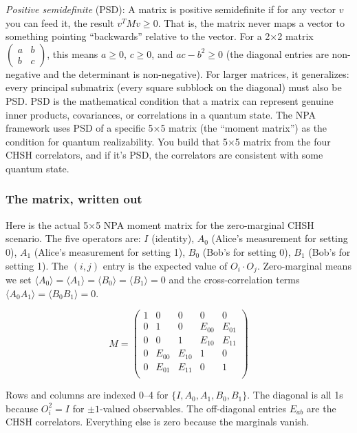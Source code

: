 \documentclass[11pt,a4paper]{article}
\theoremstyle{plain}
\theoremstyle{definition}
\theoremstyle{remark}
\begin{document}
\emph{Positive semidefinite} (PSD): A matrix is positive semidefinite if for any vector $v$ you can feed it, the result $v^T M v \geq 0$. That is, the matrix never maps a vector to something pointing ``backwards'' relative to the vector. For a 2×2 matrix $\begin{pmatrix} a & b \\ b & c \end{pmatrix}$, this means $a \geq 0$, $c \geq 0$, and $ac - b^2 \geq 0$ (the diagonal entries are non-negative and the determinant is non-negative). For larger matrices, it generalizes: every principal submatrix (every square subblock on the diagonal) must also be PSD. PSD is the mathematical condition that a matrix can represent genuine inner products, covariances, or correlations in a quantum state. The NPA framework uses PSD of a specific 5×5 matrix (the ``moment matrix'') as the condition for quantum realizability. You build that 5×5 matrix from the four CHSH correlators, and if it's PSD, the correlators are consistent with some quantum state.

\subsubsection{The matrix, written out}

Here is the actual 5×5 NPA moment matrix for the zero-marginal CHSH scenario. The five operators are: $I$ (identity), $A_0$ (Alice's measurement for setting 0), $A_1$ (Alice's measurement for setting 1), $B_0$ (Bob's for setting 0), $B_1$ (Bob's for setting 1). The $(i,j)$ entry is the expected value of $O_i \cdot O_j$. Zero-marginal means we set $\langle A_0 \rangle = \langle A_1 \rangle = \langle B_0 \rangle = \langle B_1 \rangle = 0$ and the cross-correlation terms $\langle A_0 A_1 \rangle = \langle B_0 B_1 \rangle = 0$.

\[
M = \begin{pmatrix}
1    & 0    & 0    & 0    & 0    \\
0    & 1    & 0    & E_{00} & E_{01} \\
0    & 0    & 1    & E_{10} & E_{11} \\
0    & E_{00} & E_{10} & 1 & 0    \\
0    & E_{01} & E_{11} & 0 & 1    \\
\end{pmatrix}
\]

Rows and columns are indexed 0--4 for $\{I, A_0, A_1, B_0, B_1\}$. The diagonal is all 1s because $O_i^2 = I$ for $\pm 1$-valued observables. The off-diagonal entries $E_{ab}$ are the CHSH correlators. Everything else is zero because the marginals vanish.
\end{document}
